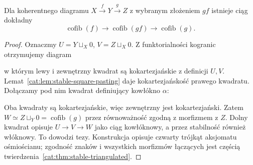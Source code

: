 \begin{stwierdzenie}\label{cat:prop:stable-cofiber-composite}
Dla koherentnego diagramu $X\xrightarrow f Y\xrightarrow g Z$ z wybranym złożeniem $gf$ istnieje ciąg dokładny
\[
 \operatorname{cofib}(f)\longrightarrow
 \operatorname{cofib}(gf)\longrightarrow
 \operatorname{cofib}(g).
\]
\end{stwierdzenie}
\begin{proof}
Oznaczmy $U=Y\sqcup_X0$, $V=Z\sqcup_X0$. Z funktorialności kogranic otrzymujemy diagram
\begin{center}
\end{center}
w którym lewy i zewnętrzny kwadrat są kokartezjańskie z definicji $U,V$. Lemat~\ref{cat:lem:stable-square-pasting} daje kokartezjańskość prawego kwadratu. Dołączamy pod nim kwadrat definiujący kowłókno $\alpha$:
\begin{center}
\end{center}
Oba kwadraty są kokartezjańskie, więc zewnętrzny jest kokartezjański. Zatem $W\simeq Z\sqcup_Y0=\operatorname{cofib}(g)$ przez równoważność zgodną z morfizmem z $Z$. Dolny kwadrat opisuje $U\to V\to W$ jako ciąg kowłóknowy, a przez stabilność również włóknowy. To dowodzi tezy. Konstrukcja opisuje czwarty trójkąt aksjomatu ośmiościanu; zgodność znaków i wszystkich morfizmów łączących jest częścią twierdzenia~\ref{cat:thm:stable-triangulated}.
\end{proof}

